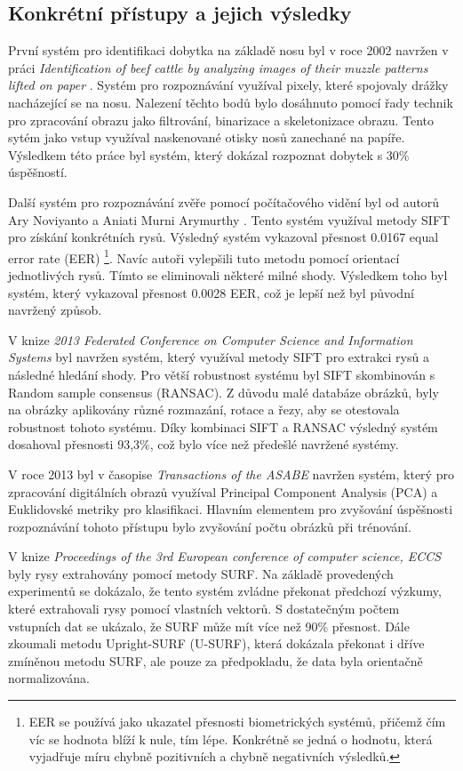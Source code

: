 \subsection{Konkrétní přístupy a jejich výsledky}

První systém pro identifikaci dobytka na základě nosu byl v roce 2002 navržen v práci \textit{Identification of beef cattle by analyzing images of their muzzle patterns lifted on paper} \cite{minagawa2002identification}. Systém pro rozpoznávání využíval pixely, které spojovaly drážky nacházející se na nosu. Nalezení těchto bodů bylo dosáhnuto pomocí řady technik pro zpracování obrazu jako filtrování, binarizace a skeletonizace obrazu. Tento sytém jako vstup využíval naskenované otisky nosů zanechané na papíře. Výsledkem této práce byl systém, který dokázal rozpoznat dobytek s 30\% úspěšností.

Další systém pro rozpoznávání zvěře pomocí počítačového vidění byl od autorů Ary Noviyanto a Aniati Murni Arymurthy \cite{NOVIYANTO201377}. Tento systém využíval metody SIFT pro získání konkrétních rysů. Výsledný systém vykazoval přesnost 0.0167 equal error rate (EER) \footnote{EER se používá jako ukazatel přesnosti biometrických systémů, přičemž čím víc se hodnota blíží k nule, tím lépe. Konkrétně se jedná o hodnotu, která vyjadřuje míru chybně pozitivních a chybně negativních výsledků.}. Navíc autoři vylepšili tuto metodu pomocí orientací jednotlivých rysů. Tímto se eliminovali některé milné shody. Výsledkem toho byl systém, který vykazoval přesnost 0.0028 EER, což je lepší než byl původní navržený způsob. 

V knize \textit{2013 Federated Conference on Computer Science and Information Systems} \cite{6644052} byl navržen systém, který využíval metody SIFT pro extrakci rysů a následné hledání shody. Pro větší robustnost systému byl SIFT skombinován s Random sample consensus (RANSAC). Z důvodu malé databáze obrázků, byly na obrázky aplikovány různé rozmazání, rotace a řezy, aby se otestovala robustnost tohoto systému. Díky kombinaci SIFT a RANSAC výsledný systém dosahoval přesnosti 93,3\%, což bylo více než předešlé navržené systémy.

V roce 2013 byl v časopise \textit{Transactions of the ASABE} navržen systém, který pro zpracování digitálních obrazů využíval Principal Component Analysis (PCA) a Euklidovské metriky pro klasifikaci. Hlavním elementem pro zvyšování úspěšnosti rozpoznávání tohoto přístupu bylo zvyšování počtu obrázků při trénování. 

V knize \textit{Proceedings of the 3rd European conference of computer science, ECCS} \cite{noviyanto2012automatic} byly rysy extrahovány pomocí metody SURF. Na základě provedených experimentů se dokázalo, že tento systém zvládne překonat předchozí výzkumy, které extrahovali rysy pomocí vlastních vektorů. S dostatečným počtem vstupních dat se ukázalo, že SURF může mít více než 90\% přesnost. Dále zkoumali metodu Upright-SURF (U-SURF), která dokázala překonat i dříve zmíněnou metodu SURF, ale pouze za předpokladu, že data byla orientačně normalizována.

